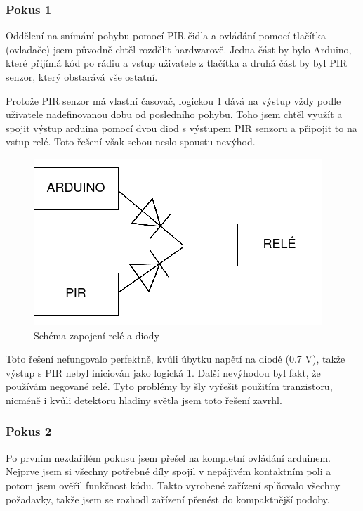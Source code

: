 \documentclass[11pt,a4paper,twoside,openright]{report}
\begin{document}
	\subsubsection{Pokus 1}
	
	Oddělení na snímání pohybu pomocí PIR čidla a ovládání pomocí tlačítka (ovladače) jsem původně chtěl rozdělit hardwarově. Jedna část by bylo Arduino, které přijímá kód po rádiu a vstup uživatele z tlačítka a druhá část by byl PIR senzor, který obstarává vše ostatní.
	
	
	Protože PIR senzor má vlastní časovač, logickou 1 dává na výstup vždy podle uživatele nadefinovanou dobu od posledního pohybu. Toho jsem chtěl využít a spojit výstup arduina pomocí dvou diod s výstupem PIR senzoru a připojit to na vstup relé. Toto řešení však sebou neslo spoustu nevýhod. 
	
	\begin{figure}[htb]
		\centering
		\includegraphics[width=0.5\hsize]{img/zapojeni_rele.png}
		\caption{Schéma zapojení relé a diody}\end{figure}
	
	Toto řešení nefungovalo perfektně, kvůli úbytku napětí na diodě (0.7 V), takže výstup s PIR nebyl iniciován jako logická 1. Další nevýhodou byl fakt, že používám negované relé. Tyto problémy by šly vyřešit použitím tranzistoru, nicméně i kvůli detektoru hladiny světla jsem toto řešení zavrhl.
	
	\subsubsection{Pokus 2}
	
	Po prvním nezdařilém pokusu jsem přešel na kompletní ovládání arduinem. Nejprve jsem si všechny potřebné díly spojil v nepájivém kontaktním poli a potom jsem ověřil funkčnost kódu. Takto vyrobené zařízení splňovalo všechny požadavky, takže jsem se rozhodl zařízení přenést do kompaktnější podoby.
	
\end{document}

